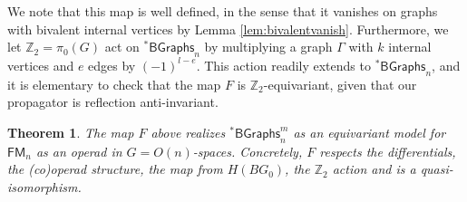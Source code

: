 \documentclass[a4paper]{amsart}
\theoremstyle{plain}
\newtheorem{thm}{Theorem}
\theoremstyle{definition}
\newcommand{\Z}{{\mathbb{Z}}}
\newcommand{\FM}{\mathsf{FM}}
\newcommand{\BstG}{{}^*\mathsf{BGraphs}}
\begin{document}
We note that this map is well defined, in the sense that it vanishes on graphs with bivalent internal vertices by Lemma \ref{lem:bivalentvanish}.
Furthermore, we let $\Z_2=\pi_0(G)$ act on $\BstG_n$ by multiplying a graph $\Gamma$ with $k$ internal vertices and $e$ edges by $(-1)^{l-e}$.
This action readily extends to $\BstG_n$, and it is elementary to check that the map $F$ is $\Z_2$-equivariant, given that our propagator is reflection anti-invariant.

\begin{thm}\label{thm:equivariant model}
The map $F$ above realizes $\BstG_n^m$ as an equivariant model for $\FM_n$ as an operad in $G=O(n)$-spaces.
 Concretely, $F$ respects the differentials, the (co)operad structure, the map from $H(BG_0)$, the $\Z_2$ action and is a quasi-isomorphism. 
 \end{thm}
\end{document}
